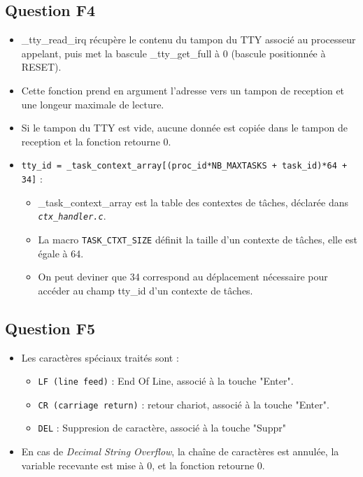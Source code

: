 \documentclass[10pt]{article}
\begin{document}
\subsection{Question F4}
\begin{itemize}
  \item \_tty\_read\_irq récupère le contenu du tampon du TTY associé au
  processeur appelant, puis met la bascule \_tty\_get\_full à 0 (bascule
  positionnée à RESET).
  \item Cette fonction prend en argument l'adresse vers un tampon de reception
  et une longeur maximale de lecture.
  \item Si le tampon du TTY est vide, aucune donnée est copiée dans le tampon
  de reception et la fonction retourne 0.
  \item \texttt{tty\_id = \_task\_context\_array[(proc\_id*NB\_MAXTASKS + task\_id)*64 + 34]} :
  \begin{itemize}
    \item \_task\_context\_array est la table des contextes de tâches, déclarée
    dans \textit{\texttt{ctx\_handler.c}}.
    \item La macro \texttt{TASK\_CTXT\_SIZE} définit la taille d'un contexte de
    tâches, elle est égale à 64.
    \item On peut deviner que 34 correspond au déplacement nécessaire pour
    accéder au champ tty\_id d'un contexte de tâches.
  \end{itemize}
\end{itemize}

\subsection{Question F5}
\begin{itemize}
  \item Les caractères spéciaux traités sont :
  \begin{itemize}
    \item \texttt{LF (line feed)} : End Of Line, associé à la touche "Enter".
    \item \texttt{CR (carriage return)} : retour chariot, associé à la touche
    "Enter".
    \item \texttt{DEL} : Suppresion de caractère, associé à la touche "Suppr"
  \end{itemize}
  \item En cas de \textit{Decimal String Overflow}, la chaîne de caractères est
  annulée, la variable recevante est mise à 0, et la fonction retourne 0.
\end{itemize}
\end{document}
